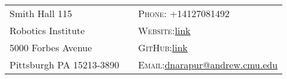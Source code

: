 \documentclass[a4paper,10pt]{article}
\begin{document}
\begin{table}[h!]

\begin{tabu}to 0.99\textwidth{X[l] X[c] X[l]}
Smith Hall 115 & & \textsc{Phone:} +14127081492 \\ 
Robotics Institute & & \textsc{Website:}\href{http://www.andrew.cmu.edu/user/dnarapur/} {link}\\
5000 Forbes Avenue & & \textsc{GitHub:}\href{https://github.com/dineshreddy91} {link} \\
Pittsburgh PA 15213-3890 & & \textsc{Email:}\href{dnarapur@andrew.cmu.edu} {dnarapur@andrew.cmu.edu}\\
\end{tabu}
\end{table}


\vspace{-4 mm}

\end{document}
